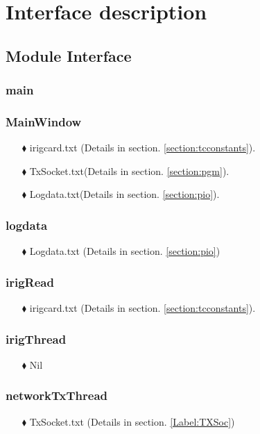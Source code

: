 \chapter{Interface description}
\label{Chapter4}

\section{Module Interface}
\subsection{main}
\subsection{MainWindow}
\begin{enumerate}
	\item [$\blacklozenge$] irigcard.txt (Details in section. \ref{section:tcconstants}).
	\item [$\blacklozenge$] TxSocket.txt(Details in section. \ref{section:pgm}).
	\item [$\blacklozenge$] Logdata.txt(Details in section. \ref{section:pio}).
	
\end{enumerate}

\subsection{logdata}
\begin{enumerate}
	\item [$\blacklozenge$] Logdata.txt (Details in section. \ref{section:pio}) 
\end{enumerate}

\subsection{irigRead}
\begin{enumerate}
	\item [$\blacklozenge$] irigcard.txt (Details in section. \ref{section:tcconstants}).
\end{enumerate}

\subsection{irigThread}
\begin{enumerate}
	\item [$\blacklozenge$] Nil
\end{enumerate}

\subsection{networkTxThread}
\begin{enumerate}
	\item [$\blacklozenge$] TxSocket.txt (Details in section. \ref{Label:TXSoc})
\end{enumerate}



